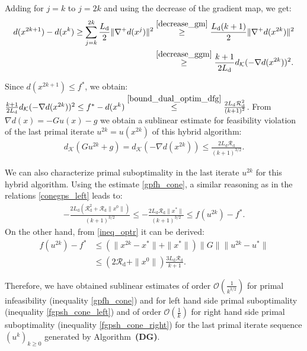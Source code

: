 \documentclass{gOMS2e}
\theoremstyle{plain}
\theoremstyle{definition}
\theoremstyle{remark}
\providecommand{\norm}[1]{\lVert#1\rVert}
\begin{document}
\noindent  Adding for $j=k$ to $j=2k$ and using the decrease of the  gradient map,  we get:
\begin{align*}
 d(x^{2k+1})  -  d(x^{k})  \geq  \sum_{j=k}^{2k}
\frac{L_\text{d}}{2} \|\nabla^+ d(x^j)\|^2 & \overset{\eqref{decrease_gm}}{\geq}
\frac{L_\text{d}(k+1)}{2} \|\nabla^+ d(x^{2k})\|^2 \\
& \overset{\eqref{decrease_ggm}}{\geq} \frac{k+1}{2L_\text{d}}
 d_{\mathcal{K}}(-\nabla d(x^{2k}))^2.
\end{align*}

\noindent Since $d(x^{2k+1}) \leq f^*$, we obtain:
$\frac{k+1}{2L_\text{d}} d_{\mathcal{K}}(-\nabla d(x^{2k}))^2  \leq f^* -
d(x^{k}) \overset{\eqref{bound_dual_optim_dfg}}{\leq} \frac{2
L_\text{d} \mathcal{R}_\text{d}^2}{(k+1)^2}$.   From $\nabla d(x) =
- G u(x) - g$  we obtain a sublinear estimate for feasibility
violation of the last primal iterate  $u^{2k} = u(x^{2k})$ of this
hybrid algorithm:
\begin{align}
\label{gpfh_cone} d_{\mathcal{K}}(G u^{2k} + g) = d_{\mathcal{K}}(-\nabla d(x^{2k}))
\leq  \frac{2 L_\text{d} \mathcal{R}_\text{d}}{(k+1)^{3/2}}.
\end{align}

\noindent We can also characterize primal suboptimality in the last
iterate $u^{2k} $ for  this hybrid algorithm. Using the  estimate
\eqref{gpfh_cone}, a similar reasoning as in the relations
\eqref{conegps_left} leads to:
\begin{align}\label{fgpsh_cone_left}
 -\frac{2L_{\text{d}}(\mathcal{R}_{\text{d}}^2 + \mathcal{R}_{\text{d}} \norm{x^0})}{(k+1)^{3/2}} \le
 -\frac{2L_{\text{d}}\mathcal{R}_{\text{d}} \norm{x^*}}{(k+1)^{3/2}} \le f(u^{2k})  - f^*.
\end{align}
On the other hand, from \eqref{ineq_optr} it can be derived:
\begin{align} \label{fgpsh_cone_right}
f(u^{2k}) - f^* & \leq   \left( \|x^{2k} - x^*\| +
\|x^*\| \right )\|G\| \|u^{2k} - u^* \|  \nonumber \\
& \leq  (2 \mathcal{R}_\text{d} + \|x^0\|) \frac{3 L_\text{d}
\mathcal{R}_\text{d}}{k+1}.
\end{align}

\noindent Therefore, we have obtained sublinear estimates  of order
$\mathcal{O}(\frac{1}{k^{3/2}})$ for primal infeasibility
(inequality \eqref{gpfh_cone}) and for left hand side primal
suboptimality (inequality \eqref{fgpsh_cone_left}) and of order
$\mathcal{O}(\frac{1}{k})$ for right hand side primal suboptimality
(inequality \eqref{fgpsh_cone_right}) for the last primal iterate
sequence $(u^k)_{k \geq 0}$ generated by Algorithm~\textbf{(DG)}.
\end{document}
